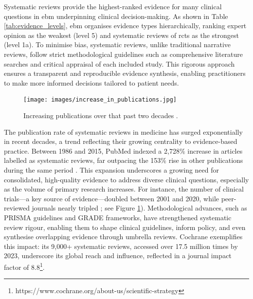 \documentclass[10pt,oneside]{book}
\begin{document}
Systematic reviews provide the highest-ranked evidence for many clinical questions in \gls*{ebm} underpinning clinical decision-making. As shown in Table \ref{tab:evidence_levels}, \gls*{ebm} organises evidence types hierarchically, ranking expert opinion as the weakest (level 5) and systematic reviews of \gls*{rcts} as the strongest (level 1a). To minimise bias, systematic reviews, unlike traditional narrative reviews, follow strict methodological guidelines such as comprehensive literature searches and critical appraisal of each included study. This rigorous approach ensures a transparent and reproducible evidence synthesis, enabling practitioners to make more informed decisions tailored to patient needs.



\begin{figure}
    \centering
    \texttt{[image: images/increase\_in\_publications.jpg]}
    \caption{Increasing publications over that past two decades \cite{ghasemi_scientific_2022}.}
    \label{fig:increasing_publications_over_time}
\end{figure}

The publication rate of systematic reviews in medicine has surged exponentially in recent decades, a trend reflecting their growing centrality to evidence-based practice. Between 1986 and 2015, PubMed indexed a 2,728\% increase in articles labelled as systematic reviews, far outpacing the 153\% rise in other publications during the same period \cite{ioannidis_mass_2016}. This expansion underscores a growing need for consolidated, high-quality evidence to address diverse clinical questions, especially as the volume of primary research increases. For instance, the number of clinical trials—a key source of evidence—doubled between 2001 and 2020, while peer-reviewed journals nearly tripled \cite{ghasemi_scientific_2022}; see Figure \ref{fig:increasing_publications_over_time}). Methodological advances, such as PRISMA guidelines and GRADE frameworks, have strengthened systematic review rigour, enabling them to shape clinical guidelines, inform policy, and even synthesise overlapping evidence through umbrella reviews. Cochrane exemplifies this impact: its 9,000+ systematic reviews, accessed over 17.5 million times by 2023, underscore its global reach and influence, reflected in a journal impact factor of 8.8\footnote{https://www.cochrane.org/about-us/scientific-strategy}.
\end{document}
